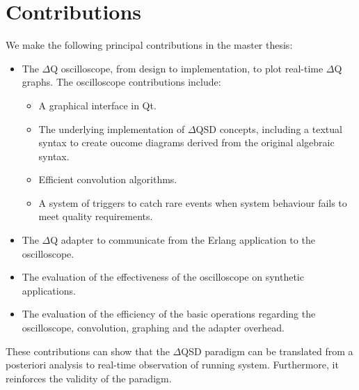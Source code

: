\section{Contributions}
    We make the following principal contributions in the master thesis:
    \begin{itemize}
        \item The $\Delta$Q oscilloscope, from design to implementation, to plot real-time $\Delta$Q graphs. The oscilloscope contributions include:
        \begin{itemize}
            \item A graphical interface in Qt.
            \item The underlying implementation of $\Delta$QSD concepts, including a textual syntax to create oucome diagrams derived from the original algebraic syntax.
            \item Efficient convolution algorithms.
            \item A system of triggers to catch rare events when system behaviour fails to meet quality requirements.
        \end{itemize}
        \item The $\Delta$Q adapter to communicate from the Erlang application to the oscilloscope.
        \item The evaluation of the effectiveness of the oscilloscope on synthetic applications.
        \item The evaluation of the efficiency of the basic operations regarding the oscilloscope, convolution, graphing and the adapter overhead.
    \end{itemize}

    These contributions can show that the $\Delta$QSD paradigm can be translated from a posteriori analysis to real-time observation of running system. Furthermore, it reinforces the validity of the paradigm.

